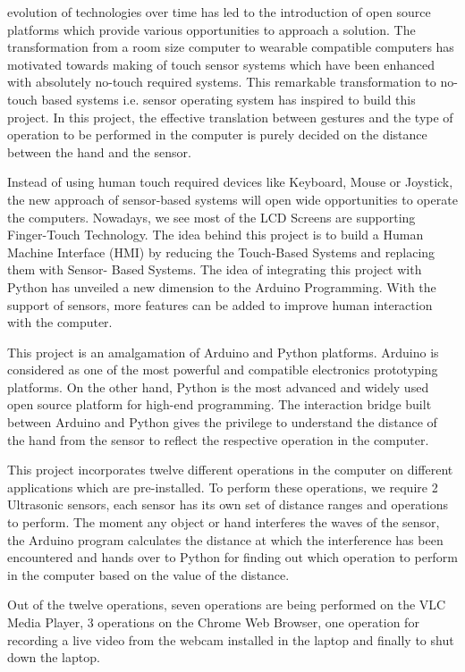 \documentclass[12pt,journal]{IEEEtran}
\begin{document}
% 
 evolution of technologies over time has led to the introduction of open source platforms which provide various opportunities to approach a solution. The transformation from a room size computer to wearable compatible computers has motivated towards making of touch sensor systems which have been enhanced with absolutely no-touch required systems. This remarkable transformation to no-touch based systems i.e. sensor operating system has inspired to build this project. In this project, the effective translation between gestures and the type of operation to be performed in the computer is purely decided on the distance between the hand and the sensor.
\par Instead of using human touch required devices like Keyboard, Mouse or Joystick, the new approach of sensor-based systems will open wide opportunities to operate the computers. Nowadays, we see most of the LCD Screens are supporting Finger-Touch Technology. The idea behind this project is to build a Human Machine Interface (HMI) by reducing the Touch-Based Systems and replacing them with Sensor- Based Systems. The idea of integrating this project with Python has unveiled a new dimension to the Arduino Programming. With the support of sensors, more features can be added to improve human interaction with the computer.
\par This project is an amalgamation of Arduino and Python platforms. Arduino is considered as one of the most powerful and compatible electronics prototyping platforms. On the other hand, Python is the most advanced and widely used open source platform for high-end programming. The interaction bridge built between Arduino and Python gives the privilege to understand the distance of the hand from the sensor to reflect the respective operation in the computer.

\par This project incorporates twelve different operations in the computer on different applications which are pre-installed. To perform these operations, we require 2 Ultrasonic sensors, each sensor has its own set of distance ranges and operations to perform. The moment any object or hand interferes the waves of the sensor, the Arduino program calculates the distance at which the interference has been encountered and hands over to Python for finding out which operation to perform in the computer based on the value of the distance. 
\newpage
\par Out of the twelve operations, seven operations are being performed on the VLC Media Player, 3 operations on the Chrome Web Browser, one operation for recording a live video from the webcam installed in the laptop and finally to shut down the laptop.
\end{document}
